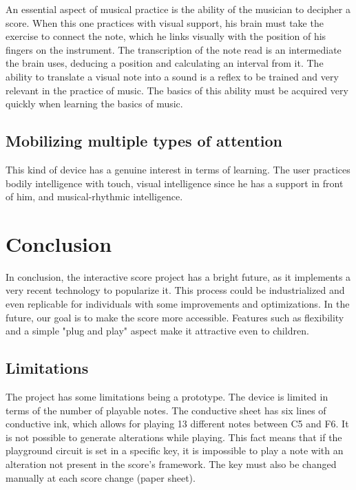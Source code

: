 An essential aspect of musical practice is the ability of the musician to decipher a score. When this one practices with visual support, his brain must take the exercise to connect the note, which he links visually with the position of his fingers on the instrument. The transcription of the note read is an intermediate the brain uses, deducing a position and calculating an interval from it. The ability to translate a visual note into a sound is a reflex to be trained and very relevant in the practice of music. The basics of this ability must be acquired very quickly when learning the basics of music.

\subsection{Mobilizing multiple types of attention}

This kind of device has a genuine interest in terms of learning. The user practices bodily intelligence with touch, visual intelligence since he has a support in front of him, and musical-rhythmic intelligence.

\section{Conclusion}

In conclusion, the interactive score project has a bright future, as it implements a very recent technology to popularize it. This process could be industrialized and even replicable for individuals with some improvements and optimizations. In the future, our goal is to make the score more accessible. Features such as flexibility and a simple "plug and play" aspect make it attractive even to children.

\subsection{Limitations}

The project has some limitations being a prototype. The device is limited in terms of the number of playable notes. The conductive sheet has six lines of conductive ink, which allows for playing 13 different notes between C5 and F6. It is not possible to generate alterations while playing. This fact means that if the playground circuit is set in a specific key, it is impossible to play a note with an alteration not present in the score's framework. The key must also be changed manually at each score change (paper sheet).

